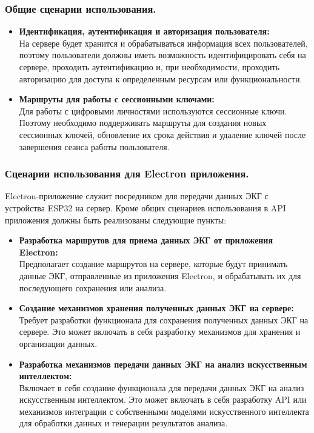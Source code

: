 \documentclass[12pt, russian]{extarticle}
\begin{document}
\begin{spacing}{1.5}
    \subsubsection{Общие сценарии использования.}

    \begin{itemize}
        \item \textbf{Идентификация, аутентификация и авторизация пользователя:} \\
            На сервере будет хранится и обрабатываться информация всех пользователей, поэтому
            пользователи должны иметь возможность идентифицировать себя на сервере,
            проходить аутентификацию и, при необходимости,
            проходить авторизацию для доступа к определенным ресурсам или функциональности.
        \item \textbf{Маршруты для работы с сессионными ключами:} \\
            Для работы с цифровыми личностями используются сессионные ключи.
            Поэтому необходимо поддерживать маршруты для создания новых сессионных ключей,
            обновление их срока действия и удаление ключей после завершения сеанса работы пользователя.
    \end{itemize}

    \subsubsection{Сценарии использования для Electron приложения.}

    Electron-приложение служит посредником для передачи данных ЭКГ с устройства ESP32 на сервер.
    Кроме общих сценариев использования в API приложения должны быть реализованы следующие пункты:

    \begin{itemize}
        \item \textbf{Разработка маршрутов для приема данных ЭКГ от приложения Electron:} \\
            Предполагает создание маршрутов на сервере, которые будут принимать данные ЭКГ,
            отправленные из приложения Electron, и обрабатывать их для последующего сохранения или анализа.
        \item \textbf{Создание механизмов хранения полученных данных ЭКГ на сервере:} \\
            Требует разработки функционала для сохранения полученных данных ЭКГ на сервере.
            Это может включать в себя разработку механизмов для хранения и организации данных.
        \item \textbf{Разработка механизмов передачи данных ЭКГ на анализ искусственным интеллектом:} \\
            Включает в себя создание функционала для передачи данных ЭКГ на анализ искусственным интеллектом.
            Это может включать в себя разработку API или механизмов интеграции с собственными моделями
            искусственного интеллекта для обработки данных и генерации результатов анализа.
    \end{itemize}


\end{spacing}
\end{document}
